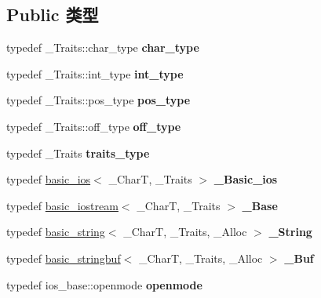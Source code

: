 \subsection*{Public 类型}
\begin{DoxyCompactItemize}
\item 
\mbox{\label{classbasic__stringstream_aab6a55fe1794c7e0bf5c1b10bc682313}} 
typedef \+\_\+\+Traits\+::char\+\_\+type {\bfseries char\+\_\+type}
\item 
\mbox{\label{classbasic__stringstream_a8e705020fc0488edfa31ed40a2b1951b}} 
typedef \+\_\+\+Traits\+::int\+\_\+type {\bfseries int\+\_\+type}
\item 
\mbox{\label{classbasic__stringstream_aa2bda414ea6c8acc34ff2005f41cea38}} 
typedef \+\_\+\+Traits\+::pos\+\_\+type {\bfseries pos\+\_\+type}
\item 
\mbox{\label{classbasic__stringstream_a37b87a9c33cd1df585d86c6ad024af6d}} 
typedef \+\_\+\+Traits\+::off\+\_\+type {\bfseries off\+\_\+type}
\item 
\mbox{\label{classbasic__stringstream_ab2d7860248a9bf0487dfec8e9d9177cd}} 
typedef \+\_\+\+Traits {\bfseries traits\+\_\+type}
\item 
\mbox{\label{classbasic__stringstream_a35a2e170a05297dd70fc961033dd0a91}} 
typedef \hyperlink{classbasic__ios}{basic\+\_\+ios}$<$ \+\_\+\+CharT, \+\_\+\+Traits $>$ {\bfseries \+\_\+\+Basic\+\_\+ios}
\item 
\mbox{\label{classbasic__stringstream_adcf4bbed2830fb111df344bc8cfd9167}} 
typedef \hyperlink{classbasic__iostream}{basic\+\_\+iostream}$<$ \+\_\+\+CharT, \+\_\+\+Traits $>$ {\bfseries \+\_\+\+Base}
\item 
\mbox{\label{classbasic__stringstream_ac91c8882781b3b88b3b9263c8be6fa5d}} 
typedef \hyperlink{classbasic__string}{basic\+\_\+string}$<$ \+\_\+\+CharT, \+\_\+\+Traits, \+\_\+\+Alloc $>$ {\bfseries \+\_\+\+String}
\item 
\mbox{\label{classbasic__stringstream_a61fb3b09b587d9ad8b04af8f5f57d4f2}} 
typedef \hyperlink{classbasic__stringbuf}{basic\+\_\+stringbuf}$<$ \+\_\+\+CharT, \+\_\+\+Traits, \+\_\+\+Alloc $>$ {\bfseries \+\_\+\+Buf}
\item 
\mbox{\label{classbasic__stringstream_a3ecae9d432cb3dab364dce5cc990b683}} 
typedef ios\+\_\+base\+::openmode {\bfseries openmode}
\end{DoxyCompactItemize}
